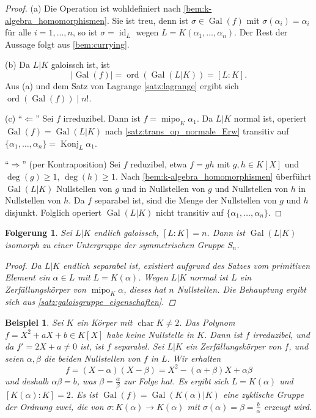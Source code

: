 \documentclass[a4paper, twoside, 11pt, ngerman]{report}
\DeclareMathOperator{\charact}{char}
\DeclareMathOperator{\Gal}{Gal}
\DeclareMathOperator{\ident}{id}
\DeclareMathOperator{\Konj}{Konj}
\DeclareMathOperator{\mipo}{mipo}
\DeclareMathOperator{\ord}{ord}
\theoremstyle{definistyle}
\newtheorem{folgerung}[satz]{Folgerung}
\newtheorem{bsp}[satz]{Beispiel}
\theoremstyle{remark}
\begin{document}
\begin{proof}
(a) Die Operation ist wohldefiniert nach \ref{bem:k-algebra_homomorphismen}. Sie ist treu, denn ist $\sigma \in \Gal(f)$ mit $\sigma(\alpha_i) = \alpha_i$ für alle $i = 1, \dots, n$, so ist $\sigma=\ident_L$ wegen $L=K(\alpha_1,\ldots,\alpha_n)$. Der Rest der Aussage folgt aus  
\ref{bem:currying}.
    
(b) Da $L|K$ galoissch ist, ist
\[
|\Gal(f)| = \ord(\Gal(L|K)) = [L : K].
\]
Aus (a) und dem Satz von Lagrange \ref{satz:lagrange} ergibt sich $\ord(\Gal(f)) \mid n!$.

(c) "`$\Leftarrow$"' Sei $f$ irreduzibel. Dann ist $f = \mipo_K \alpha_1$.
Da $L|K$ normal ist, operiert $\Gal(f)=\Gal(L|K)$ nach \ref{satz:trans_op_normale_Erw} transitiv auf $\{\alpha_1,\ldots,\alpha_n\}=\Konj_L\alpha_1$.

"`$\Rightarrow$"' (per Kontraposition)  
Sei $f$ reduzibel, etwa $f = g h$ mit $g, h \in K[X]$ und $\deg(g) \geq 1$, $\deg(h) \geq 1$.  
Nach \ref{bem:k-algebra_homomorphismen} überführt $\Gal(L|K)$ Nullstellen von $g$ und in Nullstellen von $g$
und Nullstellen von $h$ in Nullstellen von $h$. Da $f$ separabel ist, sind die Menge der Nullstellen von $g$ und $h$
disjunkt. Folglich operiert $\Gal(L|K)$ nicht transitiv auf $\{\alpha_1, \dots, \alpha_n\}$.
\end{proof}

\begin{folgerung}\label{folg:galoisgruppe_in_sn}
Sei $L|K$ endlich galoissch, $[L : K] = n$.  
Dann ist $\Gal(L|K)$ isomorph zu einer Untergruppe der symmetrischen Gruppe $S_n$.

\begin{proof}
Da $L|K$ endlich separabel ist, existiert aufgrund des Satzes vom primitiven Element ein $\alpha \in L$ mit $L = K(\alpha)$. 
Wegen $L|K$ normal ist $L$ ein Zerfällungskörper von $\mipo_K \alpha$, dieses hat $n$ Nullstellen. Die Behauptung
ergibt sich aus \ref{satz:galoisgruppe_eigenschaften}.
\end{proof}
\end{folgerung}

\begin{bsp}\label{bsp:galoisgruppe_qaudrat_polynom}
Sei $K$ ein Körper mit $\charact K\neq 2$. Das Polynom $f = X^2 + a X + b \in K[X]$ habe keine Nullstelle in $K$.  
Dann ist $f$ irreduzibel, und da $f'=2X+a\neq0$ ist, ist $f$ separabel.
Sei $L|K$ ein Zerfällungskörper von $f$, und seien $\alpha, \beta$ die beiden Nullstellen von $f$ in $L$.
Wir erhalten
\[
f = (X - \alpha)(X - \beta) = X^2 - (\alpha + \beta) X + \alpha \beta
\]
und deshalb $\alpha\beta=b$, was $\beta=\frac{\alpha}{\beta}$ zur Folge hat. Es ergibt sich $L=K(\alpha)$
und $[K(\alpha):K]=2$. Es ist $\Gal(f)=\Gal(K(\alpha)|K)$ eine zyklische Gruppe der Ordnung zwei, die
von $\sigma\colon K(\alpha)\to K(\alpha)$ mit $\sigma(\alpha)=\beta=\frac{b}{\alpha}$ erzeugt wird.
\end{bsp}
\end{document}
